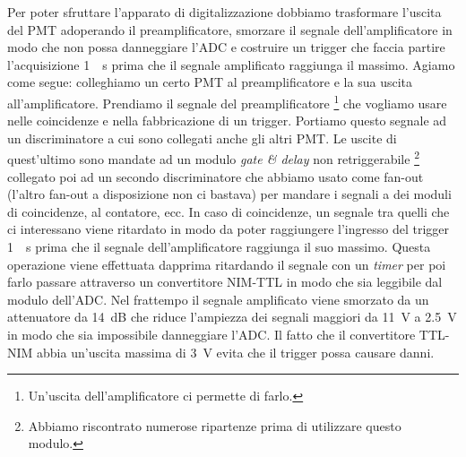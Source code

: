 Per poter sfruttare l'apparato di digitalizzazione dobbiamo trasformare l'uscita del PMT adoperando il preamplificatore, smorzare il segnale dell'amplificatore in modo che non possa danneggiare l'ADC e costruire un trigger che faccia partire l'acquisizione \SI{1}{\mu s} prima che il segnale amplificato raggiunga il massimo.
Agiamo come segue: 
colleghiamo un certo PMT al preamplificatore e la sua uscita all'amplificatore. Prendiamo il segnale del preamplificatore%
\footnote{Un'uscita dell'amplificatore ci permette di farlo.}
che vogliamo usare nelle coincidenze e nella fabbricazione di un trigger. Portiamo questo segnale ad un discriminatore a cui sono collegati anche gli altri PMT. Le uscite di quest'ultimo sono mandate ad un modulo \emph{gate \& delay}
non retriggerabile%
\footnote{Abbiamo riscontrato numerose ripartenze prima di utilizzare questo modulo.}
collegato poi ad un secondo discriminatore che abbiamo usato come fan-out (l'altro fan-out a disposizione non ci bastava) per mandare i segnali a dei moduli di coincidenze, al contatore, ecc. In caso di coincidenze, un segnale tra quelli che ci interessano viene ritardato in modo da poter raggiungere l'ingresso del trigger  \SI{1}{\mu s} prima che il segnale dell'amplificatore raggiunga il suo massimo. Questa operazione viene effettuata dapprima ritardando il segnale con un \emph{timer} per poi farlo passare attraverso un convertitore NIM-TTL in modo che sia leggibile dal modulo dell'ADC. Nel frattempo il segnale amplificato viene smorzato da un attenuatore da \SI{14}{dB} che riduce l'ampiezza dei segnali maggiori da \SI{11}{V} a \SI{2.5}{V} in modo che sia impossibile danneggiare l'ADC. Il fatto che il convertitore TTL-NIM abbia un'uscita massima di \SI{3}{V} evita che il trigger possa causare danni.
